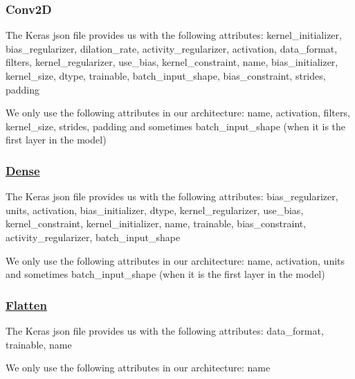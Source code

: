 \subsubsection*{Conv2D}

The Keras json file provides us with the following attributes\+: {\ttfamily kernel\+\_\+initializer, bias\+\_\+regularizer, dilation\+\_\+rate, activity\+\_\+regularizer, activation, data\+\_\+format, filters, kernel\+\_\+regularizer, use\+\_\+bias, kernel\+\_\+constraint, name, bias\+\_\+initializer, kernel\+\_\+size, dtype, trainable, batch\+\_\+input\+\_\+shape, bias\+\_\+constraint, strides, padding}

We only use the following attributes in our architecture\+: {\ttfamily name, activation, filters, kernel\+\_\+size, strides, padding} and sometimes {\ttfamily batch\+\_\+input\+\_\+shape} (when it is the first layer in the model)

\subsubsection*{\hyperlink{classDense}{Dense}}

The Keras json file provides us with the following attributes\+: {\ttfamily bias\+\_\+regularizer, units, activation, bias\+\_\+initializer, dtype, kernel\+\_\+regularizer, use\+\_\+bias, kernel\+\_\+constraint, kernel\+\_\+initializer, name, trainable, bias\+\_\+constraint, activity\+\_\+regularizer, batch\+\_\+input\+\_\+shape}

We only use the following attributes in our architecture\+: {\ttfamily name, activation, units} and sometimes {\ttfamily batch\+\_\+input\+\_\+shape} (when it is the first layer in the model)

\subsubsection*{\hyperlink{classFlatten}{Flatten}}

The Keras json file provides us with the following attributes\+: {\ttfamily data\+\_\+format, trainable, name}

We only use the following attributes in our architecture\+: {\ttfamily name} 